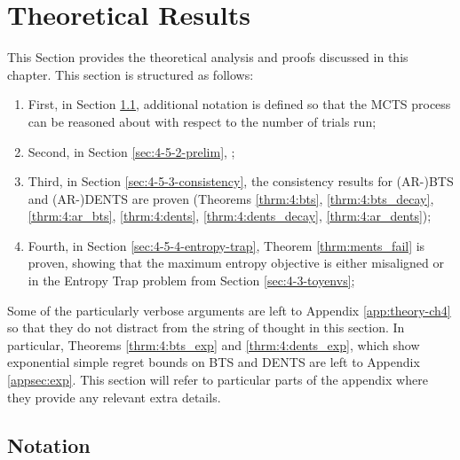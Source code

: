 \section{Theoretical Results}
\label{sec:4-5-theory}




    This Section provides the theoretical analysis and proofs discussed in this chapter. This section is structured as follows:
    \begin{enumerate}
        \item First, in Section \ref{sec:4-5-1-notation}, additional notation is defined so that the MCTS process can be reasoned about with respect to the number of trials run;
        \item Second, in Section \ref{sec:4-5-2-prelim}, ;
        \item Third, in Section \ref{sec:4-5-3-consistency}, the consistency results for (AR-)BTS and (AR-)DENTS are proven (Theorems \ref{thrm:4:bts}, \ref{thrm:4:bts_decay}, \ref{thrm:4:ar_bts}, \ref{thrm:4:dents}, \ref{thrm:4:dents_decay}, \ref{thrm:4:ar_dents}); 
        \item Fourth, in Section \ref{sec:4-5-4-entropy-trap}, Theorem \ref{thrm:ments_fail} is proven, showing that the maximum entropy objective is either misaligned or  in the Entropy Trap problem from Section \ref{sec:4-3-toyenvs};
    \end{enumerate}

    Some of the particularly verbose arguments are left to Appendix \ref{app:theory-ch4} so that they do not distract from the string of thought in this section. In particular, Theorems \ref{thrm:4:bts_exp} and \ref{thrm:4:dents_exp}, which show exponential simple regret bounds on BTS and DENTS are left to Appendix \ref{appsec:exp}. This section will refer to particular parts of the appendix where they provide any relevant extra details. 






\subsection{Notation}
\label{sec:4-5-1-notation}

